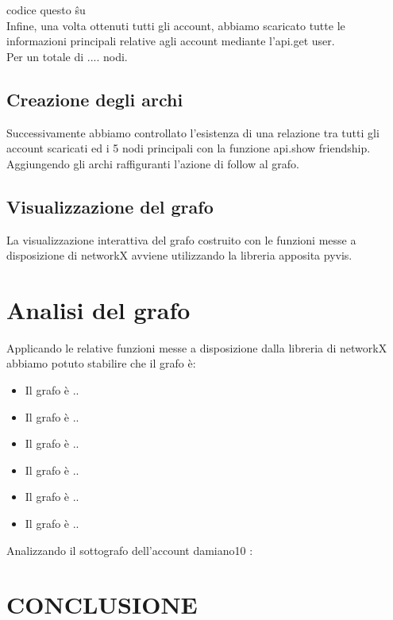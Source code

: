 \documentclass[a4paper,11pt]{report}
\begin{document}
codice questo     \^ su \\
Infine, una volta ottenuti tutti gli account, abbiamo scaricato tutte le informazioni principali relative agli account mediante l'api.get user.\\
Per un totale di  .... nodi.
\section{Creazione degli archi}
Successivamente abbiamo controllato l'esistenza di una relazione tra tutti gli account scaricati ed i 5 nodi principali con la funzione api.show friendship. Aggiungendo gli archi raffiguranti l'azione di follow al grafo.

\section{Visualizzazione del grafo}
La visualizzazione interattiva del grafo costruito con le funzioni messe a disposizione di networkX avviene utilizzando la libreria apposita pyvis.
\pagebreak
\chapter{Analisi del grafo}
Applicando le relative funzioni messe a disposizione dalla libreria di networkX abbiamo potuto stabilire che il grafo è:
\begin{itemize}
	\item Il grafo è ..
	\item Il grafo è ..
	\item Il grafo è ..
	\item Il grafo è ..
	\item Il grafo è ..
	\item Il grafo è ..
\end{itemize}
Analizzando il sottografo dell'account damiano10 :

\pagebreak

\chapter{CONCLUSIONE}
\pagebreak
\end{document}
